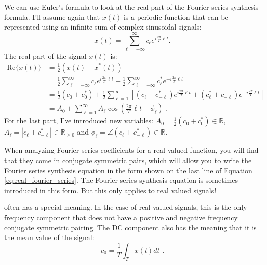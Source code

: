 We can use Euler's formula to look at
the real part of the Fourier series synthesis formula. I'll assume again that $x(t)$ is a
periodic function that can be represented using an infinite sum of complex sinusoidal signals:
\begin{equation}
  x(t) = \sum_{\ell = -\infty}^{\infty} c_{\ell} e^{i\frac{2\pi}{T}\ell t}.
\end{equation}
The real part of the signal $x(t)$ is:
\begin{align}
  \mathrm{Re}\{x(t)\} & = \frac{1}{2} (x(t) + x^*(t))                                                                                                                                             \\
                      & = \frac{1}{2}\sum_{\ell=-\infty}^{\infty} c_{\ell} e^{i\frac{2\pi}{T}\ell t} + \frac{1}{2}\sum_{\ell=-\infty}^{\infty} c^*_{\ell} e^{-i\frac{2\pi}{T}\ell t}              \\
                      & = \frac{1}{2}(c_0 + c_0^*) + \frac{1}{2}\sum_{\ell=1}^{\infty}[ (c_{\ell} + c^*_{-\ell}) e^{i\frac{2\pi}{T}\ell t} + (c^*_{\ell} + c_{-\ell}) e^{-i\frac{2\pi}{T}\ell t}] \\
                      & = A_0 + \sum_{\ell=1}^{\infty} A_\ell \cos\left(\frac{2\pi}{T}\ell t+\phi_\ell\right) \,\,.
  \label{eq:real_fourier_series}
\end{align}
For the last part, I've introduced new variables: $A_0= \frac{1}{2}(c_0 + c_0^*) \in \mathbb{R}$, $A_\ell = |c_{\ell} +c^*_{-\ell}|\in \mathbb{R}_{\ge 0}$ and $\phi_\ell = \angle (c_{\ell} + c^*_{-\ell}) \in \mathbb{R}$.

When analyzing Fourier series coefficients for a real-valued function,
you will find that they come in conjugate symmetric pairs, which will
allow you to write the Fourier series synthesis equation in the form
shown on the last line of Equation \ref{eq:real_fourier_series}.  The
Fourier series synthesis equation is sometimes introduced in this
form. But this only applies to real valued signals!

 often has a
special meaning. In the case of real-valued signals, this is the only
frequency component that does not have a positive and negative
frequency conjugate symmetric pairing. The DC component also has the
meaning that it is the mean value of the signal:
\begin{equation}
  c_0 = \frac{1}{T} \int_{T} x(t) dt \,\,.
\end{equation}

